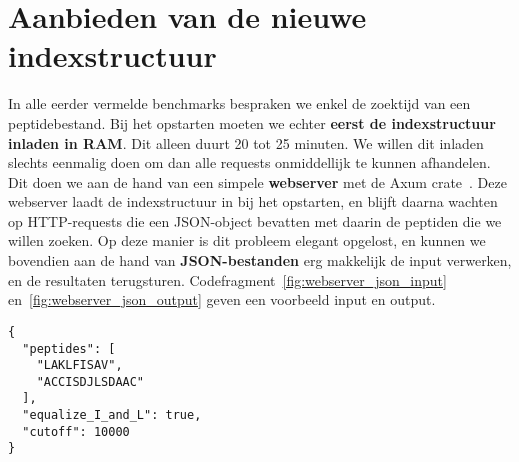 \section{Aanbieden van de nieuwe indexstructuur}\label{sec:aanbieden-van-de-nieuwe-indexstructuur}
In alle eerder vermelde benchmarks bespraken we enkel de zoektijd van een peptidebestand.
Bij het opstarten moeten we echter \textbf{eerst de indexstructuur inladen in RAM}.
Dit alleen duurt 20 tot 25 minuten.
We willen dit inladen slechts eenmalig doen om dan alle requests onmiddellijk te kunnen afhandelen.
Dit doen we aan de hand van een simpele \textbf{webserver} met de Axum crate~\cite{axum}.
Deze webserver laadt de indexstructuur in bij het opstarten, en blijft daarna wachten op HTTP-requests die een JSON-object bevatten met daarin de peptiden die we willen zoeken.
Op deze manier is dit probleem elegant opgelost, en kunnen we bovendien aan de hand van \textbf{JSON-bestanden} erg makkelijk de input verwerken, en de resultaten terugsturen.
Codefragment~\ref{fig:webserver_json_input} en~\ref{fig:webserver_json_output} geven een voorbeeld input en output.

\begin{listing}[H]
    \begin{verbatim}
{
  "peptides": [
    "LAKLFISAV",
    "ACCISDJLSDAAC"
  ],
  "equalize_I_and_L": true,
  "cutoff": 10000
}
    \end{verbatim}
    \caption{Voorbeeld JSON-input voor de webserver waarbij de peptiden \texttt{LAKLFISAV} en \texttt{ACCISDJLSDAAC} gezocht worden.
    Tijdens het zoeken worden I en L gelijkgesteld, en wordt de drempelwaarde B=10 gebruikt.
    Indien er meer matches zijn dan de drempelwaarde B, worden er slechts B matches teruggegeven en wordt de resulterende LCA* op 1 gezet.
    Dit laatste argument zou ook weggelaten kunnen worden aangezien de standaardwaarde gebruikt wordt.}
    \label{fig:webserver_json_input}
\end{listing}

